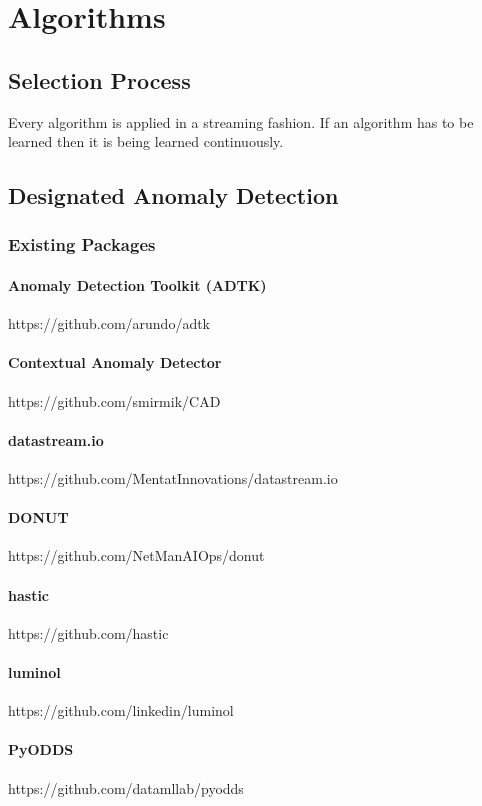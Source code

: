 \section{Algorithms}\label{sect:algorithms}
\subsection{Selection Process}
Every algorithm is applied in a streaming fashion. If an algorithm has to be
learned then it is being learned continuously.

\subsection{Designated Anomaly Detection}
\subsubsection{Existing Packages}
\paragraph{Anomaly Detection Toolkit (ADTK)}
https://github.com/arundo/adtk

\paragraph{Contextual Anomaly Detector}
https://github.com/smirmik/CAD

\paragraph{datastream.io}
https://github.com/MentatInnovations/datastream.io

\paragraph{DONUT}
https://github.com/NetManAIOps/donut

\paragraph{hastic}
https://github.com/hastic

\paragraph{luminol}
https://github.com/linkedin/luminol

\paragraph{PyODDS}
https://github.com/datamllab/pyodds

